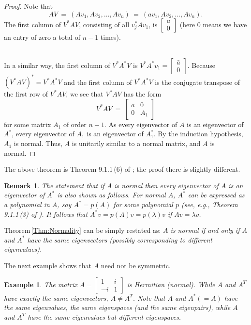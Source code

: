 \documentclass{article}
\newtheorem{rek}{Remark}
\newtheorem{exa}{Example}
\begin{document}
\begin{proof}
Note that
$$AV \ = \ (Av_1, Av_2, \dots, Av_n) \ = \ (a v_1, Av_2, \dots, Av_n).$$ The first column of $V^*AV$,
consisting of all  $v^*_jAv_1$,     is
$\begin{bmatrix}
a   \\
0 \end{bmatrix}$ (here 0 means we have an entry of zero a total of $n-1$ times). \\ \

In a similar way, the first column of $V^*A^*V$ is $ V^*A^*v_1=
 \begin{bmatrix}
\bar{a}  \\
0 \end{bmatrix}$. Because $(V^*AV)^*=V^*A^*V$ and  the first column of $V^*A^*V$ is the conjugate transpose of the first row of $V^*AV$,
 we see that $V^*AV$ has the form
$$
V^*AV \ =  \  \begin{bmatrix}
a & 0 \\
0 & A_1 \end{bmatrix}$$ for   %
some matrix $A_1$ of order $n-1$. As every eigenvector of $A$ is an
eigenvector of $A^*$,   every eigenvector of $A_1$ is an
eigenvector of $A^*_1$.
By the induction hypothesis, $A_1$ is normal. Thus,  $A$ is unitarily similar to a  normal matrix, and $A$ is normal.
\end{proof}

The above theorem  is Theorem 9.1.1\,(6) of \cite{Zh}; the proof there is slightly different.



\begin{rek} The statement that if $A$ is normal then every eigenvector  of $A$ is an eigenvector of $A^*$ is also shown as follows. For normal $A$,  $A^*$ can be expressed as a polynomial in $A$, say $A^*=p(A)$ for some polynomial $p$ (see, e.g., Theorem 9.1.1\,(3) of \cite{Zh}). It follows that $A^*v=p(A)v =p(\lambda )v$ if $Av=\lambda v$. \end{rek}

Theorem\,\ref{Thm:Normality}  can be simply restated as: \emph{$A$ is normal if and only if $A$ and $A^*$ have the same eigenvectors (possibly corresponding to different eigenvalues).}
\medskip

The next example shows that $A$ need not be symmetric.

\begin{exa}\rm  The matrix $A=\begin{bmatrix} 1 & i \\-i & 1\end{bmatrix}$ is Hermitian (normal). While $A$ and $A^T$ have exactly  the same eigenvectors, $A\not =A^T$. Note that $A$ and $A^*(=A)$ have the same eigenvalues, the same eigenspaces (and the same eigenpairs), while $A$ and $A^T$ have the same eigenvalues but different eigenspaces.
 \end{exa}
\end{document}
